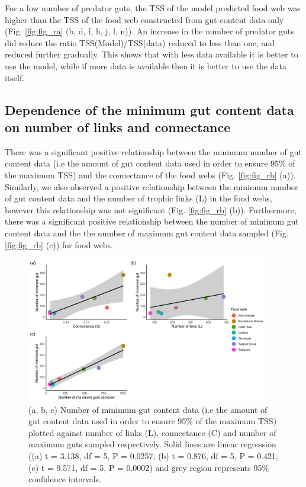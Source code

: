 \documentclass{article}
\begin{document}
For a low number of predator guts, the TSS of the model predicted food
web was higher than the TSS of the food web constructed from gut content
data only (Fig. \ref{fig:fig_ra} (b, d, f, h, j, l, n)). An increase in
the number of predator guts did reduce the ratio TSS(Model)/TSS(data)
reduced to less than one, and reduced further gradually. This shows that
with less data available it is better to use the model, while if more
data is available then it is better to use the data itself.

\hypertarget{dependence-of-the-minimum-gut-content-data-on-number-of-links-and-connectance}{%
\subsection{Dependence of the minimum gut content data on number of
links and
connectance}\label{dependence-of-the-minimum-gut-content-data-on-number-of-links-and-connectance}}

There was a significant positive relationship between the minimum number
of gut content data (i.e the amount of gut content data used in order to
ensure 95\% of the maximum TSS) and the connectance of the food webs
(Fig. \ref{fig:fig_rb} (a)). Similarly, we also observed a positive
relationship between the minimum number of gut content data and the
number of trophic links (L) in the food webs, however this relationship
was not significant (Fig. \ref{fig:fig_rb} (b)). Furthermore, there was
a significant positive relationship between the number of minimum gut
content data and the the number of maximum gut content data sampled
(Fig. \ref{fig:fig_rb} (c)) for food webs.

\begin{figure}

{\centering \includegraphics[width=400px]{../../results/misc/plot_min_gut_vs_X} 

}

\caption{\label{fig:fig_rb} (a, b, c) Number of minimum gut content data (i.e the amount of gut content data used in order to ensure 95\% of the maximum TSS) plotted against number of links (L), connectance (C) and number of maximum guts sampled respectively. Solid lines are linear regression ((a) t = 3.138, df = 5, P = 0.0257; (b) t = 0.876, df = 5, P = 0.421; (c) t = 9.571, df = 5, P = 0.0002) and grey region represents 95\% confidence intervals.}\label{fig:unnamed-chunk-3}
\end{figure}
\end{document}
